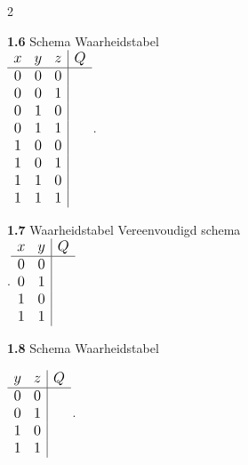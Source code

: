 \documentclass[a4paper,12pt]{paper}
\begin{document}
\begin{multicols}{2}
\begin{tcolorbox}
\textbf{1.6}
Schema \hspace{18em}  Waarheidstabel\\
\raggedleft
\hspace{10em}\(
\large
\begin{array}{ccc|c}
x & y & z & Q\\
\hline
0 & 0 & 0 &   \\
0 & 0 & 1 &   \\
0 & 1 & 0 &   \\
0 & 1 & 1 &   \\
1 & 0 & 0 &   \\
1 & 0 & 1 &   \\
1 & 1 & 0 &   \\
1 & 1 & 1 &   \\
\end{array}
\)\hspace{0.2cm}.

\vspace{0.5cm}
\end{tcolorbox}

\begin{tcolorbox}
\textbf{1.7} Waarheidstabel  \hspace{6em}  Vereenvoudigd schema\\
.\hspace{0.6cm}\(
\large
\begin{array}{cc|c}
x & y & Q \\
\hline
0 & 0 &   \\
0 & 1 &   \\
1 & 0 &   \\
1 & 1 &  
\end{array}
\)
\vspace{3cm}
\end{tcolorbox}

\begin{tcolorbox}
\textbf{1.8}
Schema \hspace{7.5cm} Waarheidstabel

\raggedleft
\(
\large
\begin{array}{cc|c}
y & z & Q \\
\hline
0 & 0 &   \\
0 & 1 &   \\
1 & 0 &   \\
1 & 1 &  
\end{array}
\)\hspace{0.2cm}.

\vspace{0.2cm}
\end{tcolorbox}


\end{multicols}
\end{document}
